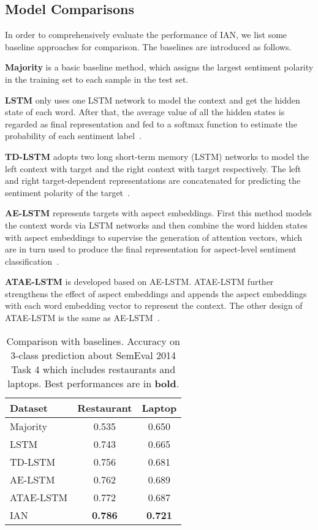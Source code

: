 \documentclass{article}
\begin{document}
\subsection{Model Comparisons}
In order to comprehensively evaluate the performance of IAN, we list some baseline approaches for comparison.
The baselines are introduced as follows.

 \textbf{Majority} is a basic baseline method, which assigns the largest sentiment polarity in the training set to each sample in the test set.

 \textbf{LSTM} only uses one LSTM network to model the context and get the hidden state of each word. After that, the average value of all the hidden states is regarded as final representation  and fed to a softmax function to estimate the probability of each sentiment label~\cite{wang2016attention}.

 \textbf{TD-LSTM} adopts two  long short-term memory (LSTM) networks to model the left context with target and the right context with target respectively.
The left and right target-dependent representations are concatenated for predicting the sentiment polarity of the target~\cite{tang2015effective}.

 \textbf{AE-LSTM} represents targets with aspect embeddings. First this method models the context words via LSTM networks and then combine the word hidden states with aspect embeddings to supervise the generation of attention vectors, which are in turn used to produce the final representation for aspect-level sentiment classification~\cite{wang2016attention}. 

 \textbf{ATAE-LSTM} is developed based on AE-LSTM.  ATAE-LSTM further strengthens the effect of aspect embeddings and  appends the aspect embeddings with each word embedding  vector to represent the context. The other design of ATAE-LSTM is the same as AE-LSTM~\cite{wang2016attention}.

\begin{table}[tbp]
	\begin{center}
    		\begin{tabular}{|l|c|c|}
			\hline
			Dataset           &Restaurant        &Laptop          \\ \hline \hline
			Majority          &0.535              &0.650   			 \\ \hline
			LSTM 	       	  &0.743              &0.665             \\ \hline
			TD-LSTM           &0.756	          &0.681             \\ \hline
			AE-LSTM           &0.762 	          &0.689             \\ \hline
			ATAE-LSTM         &0.772	          &0.687             \\ \hline
			IAN               &\textbf{0.786}     &\textbf{0.721}    \\ \hline
		\end{tabular}
		\caption{Comparison with baselines. Accuracy on 3-class prediction about SemEval 2014 Task 4 which includes restaurants and laptops. Best performances are in \textbf{bold}.}
		\label{tab:result}
	\end{center}
\end{table}
\end{document}
